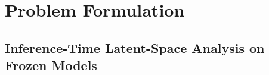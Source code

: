 \documentclass{article}
\begin{document}

\section{Problem Formulation}

\subsection{Inference-Time Latent-Space Analysis on Frozen Models}
\end{document}
